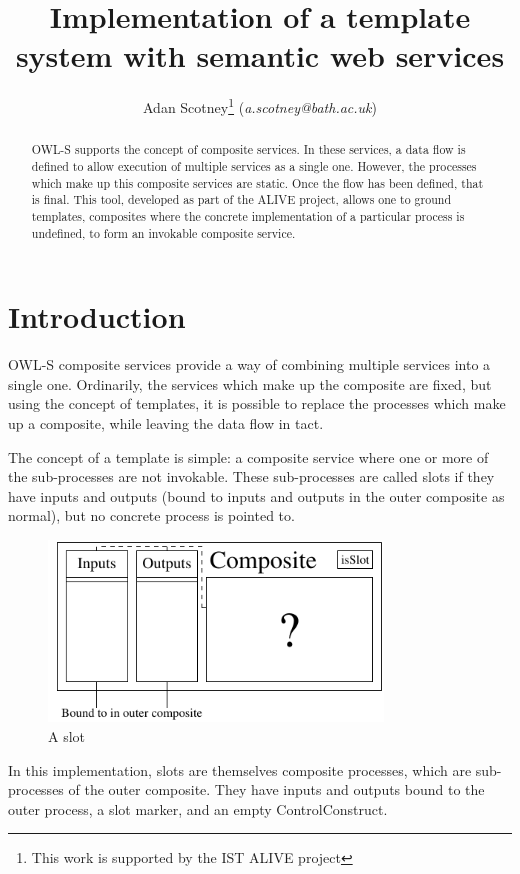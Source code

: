 \documentclass{llncs}
\title{Implementation of a template system with semantic web services}
\author{Adan Scotney\thanks{This work is supported by the IST ALIVE project} \small{(\emph{a.scotney@bath.ac.uk})}}
\institute{University of Bath}
\begin{document}
\maketitle
\begin{abstract}
 OWL-S supports the concept of composite services. In these services, a data 
 flow is defined to allow execution of multiple services as a single one. 
 However, the processes which make up this composite services are static. Once 
 the flow has been defined, that is final. This tool, developed as part of the 
 ALIVE \cite{alive} project, allows one to ground templates, composites where the concrete 
 implementation of a particular process is undefined, to form an invokable 
 composite service.
\end{abstract}
\section{Introduction}
 OWL-S \cite{owls} composite services provide a way of combining multiple services into a 
 single one. Ordinarily, the services which make up the composite are fixed, 
 but using the concept of templates, it is possible to replace the processes 
 which make up a composite, while leaving the data flow in tact.

 The concept of a template is simple: a composite service where one or more of 
 the sub-processes are not invokable. These sub-processes are called slots if 
 they have inputs and outputs (bound to inputs and outputs in the outer 
 composite as normal), but no concrete process is pointed to.

\begin{figure}[htb]
\vspace{-15pt}
\begin{center}
\includegraphics[width=3.5in]{slotDiagram}
\caption{A slot}
\end{center}
\vspace{-25pt}
\end{figure}

 In this implementation, slots are themselves composite processes, which are 
 sub-processes of the outer composite. They have inputs and outputs bound to 
 the outer process, a slot marker, and an empty ControlConstruct.
\end{document}
